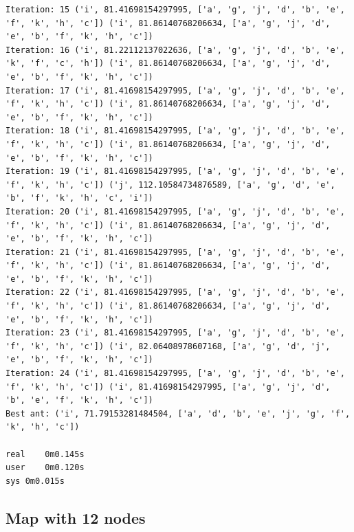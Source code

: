 \documentclass[11pt]{article}
\begin{document}
\begin{lstlisting}
Iteration: 15 ('i', 81.41698154297995, ['a', 'g', 'j', 'd', 'b', 'e', 'f', 'k', 'h', 'c']) ('i', 81.86140768206634, ['a', 'g', 'j', 'd', 'e', 'b', 'f', 'k', 'h', 'c'])
Iteration: 16 ('i', 81.22112137022636, ['a', 'g', 'j', 'd', 'b', 'e', 'k', 'f', 'c', 'h']) ('i', 81.86140768206634, ['a', 'g', 'j', 'd', 'e', 'b', 'f', 'k', 'h', 'c'])
Iteration: 17 ('i', 81.41698154297995, ['a', 'g', 'j', 'd', 'b', 'e', 'f', 'k', 'h', 'c']) ('i', 81.86140768206634, ['a', 'g', 'j', 'd', 'e', 'b', 'f', 'k', 'h', 'c'])
Iteration: 18 ('i', 81.41698154297995, ['a', 'g', 'j', 'd', 'b', 'e', 'f', 'k', 'h', 'c']) ('i', 81.86140768206634, ['a', 'g', 'j', 'd', 'e', 'b', 'f', 'k', 'h', 'c'])
Iteration: 19 ('i', 81.41698154297995, ['a', 'g', 'j', 'd', 'b', 'e', 'f', 'k', 'h', 'c']) ('j', 112.10584734876589, ['a', 'g', 'd', 'e', 'b', 'f', 'k', 'h', 'c', 'i'])
Iteration: 20 ('i', 81.41698154297995, ['a', 'g', 'j', 'd', 'b', 'e', 'f', 'k', 'h', 'c']) ('i', 81.86140768206634, ['a', 'g', 'j', 'd', 'e', 'b', 'f', 'k', 'h', 'c'])
Iteration: 21 ('i', 81.41698154297995, ['a', 'g', 'j', 'd', 'b', 'e', 'f', 'k', 'h', 'c']) ('i', 81.86140768206634, ['a', 'g', 'j', 'd', 'e', 'b', 'f', 'k', 'h', 'c'])
Iteration: 22 ('i', 81.41698154297995, ['a', 'g', 'j', 'd', 'b', 'e', 'f', 'k', 'h', 'c']) ('i', 81.86140768206634, ['a', 'g', 'j', 'd', 'e', 'b', 'f', 'k', 'h', 'c'])
Iteration: 23 ('i', 81.41698154297995, ['a', 'g', 'j', 'd', 'b', 'e', 'f', 'k', 'h', 'c']) ('i', 82.06408978607168, ['a', 'g', 'd', 'j', 'e', 'b', 'f', 'k', 'h', 'c'])
Iteration: 24 ('i', 81.41698154297995, ['a', 'g', 'j', 'd', 'b', 'e', 'f', 'k', 'h', 'c']) ('i', 81.41698154297995, ['a', 'g', 'j', 'd', 'b', 'e', 'f', 'k', 'h', 'c'])
Best ant: ('i', 71.79153281484504, ['a', 'd', 'b', 'e', 'j', 'g', 'f', 'k', 'h', 'c'])

real	0m0.145s
user	0m0.120s
sys	0m0.015s
\end{lstlisting}

\subsection{Map with 12 nodes}
\end{document}
